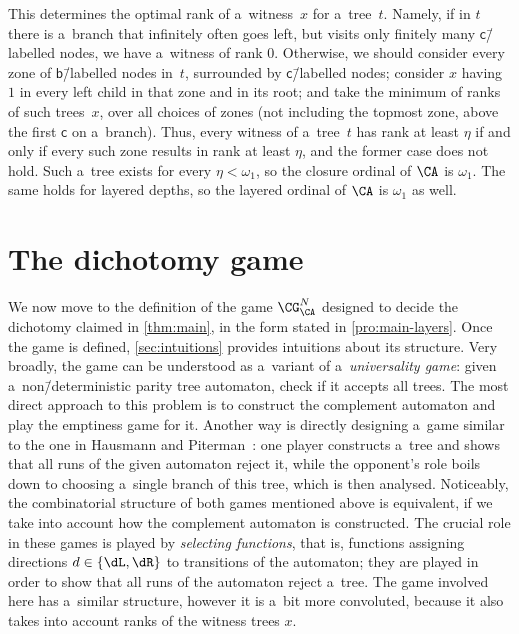 \begin{exa}
	This determines the optimal rank of a~witness~$x$ for a~tree~$t$.
	Namely, if in $t$ there is a~branch that infinitely often goes left, but visits only finitely many $\mathsf{c}$\=/labelled nodes, we have a~witness of rank $0$.
	Otherwise, we should consider every zone of $\mathsf{b}$\=/labelled nodes in~$t$, surrounded by $\mathsf{c}$\=/labelled nodes;
	consider $x$ having $1$ in every left child in that zone and in its root; and take the minimum of ranks of such trees~$x$, over all choices of zones
	(not including the topmost zone, above the first $\mathsf{c}$ on a~branch).
	Thus, every witness of a~tree~$t$ has rank at least $\eta$ if and only if every such zone results in rank at least $\eta$, and the former case does not hold.
	Such a~tree exists for every $\eta<\omega_1$, so the closure ordinal of $\CA$ is $\omega_1$.
	The same holds for layered depths, so the layered ordinal of $\CA$ is $\omega_1$ as well.
\end{exa}



\section{The dichotomy game}

We now move to the definition of the game $\CG^N_\CA$ designed to decide the dichotomy claimed in \cref{thm:main}, in the form stated in \cref{pro:main-layers}.
Once the game is defined, \cref{sec:intuitions} provides intuitions about its structure.
Very broadly, the game can be understood as a~variant of a~\emph{universality game}: given a~non\=/deterministic parity tree automaton, check if it accepts all trees.
The most direct approach to this problem is to construct the complement automaton and play the emptiness game for it.
Another way is directly designing a~game similar to the one in Hausmann and Piterman~\cite[Section~4.2]{Hausmann2022}:
one player constructs a~tree and shows that all runs of the given automaton reject it, while the opponent's role boils down to choosing a~single branch of this tree, which is then analysed.
Noticeably, the combinatorial structure of both games mentioned above is equivalent, if we take into account how the complement automaton is constructed.
The crucial role in these games is played by \emph{selecting functions}, that is, functions assigning directions $d\in\{\dL,\dR\}$ to transitions of the automaton;
they are played in order to show that all runs of the automaton reject a~tree.
The game involved here has a~similar structure, however it is a~bit more convoluted, because it also takes into account ranks of the witness trees $x$.

